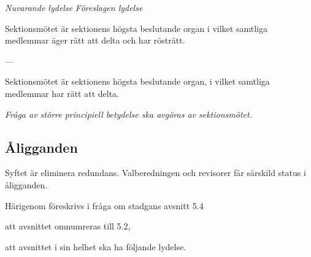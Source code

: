 \documentclass{article}
\newenvironment{lydelse}
    {\begin{paracol}{2}%
        \emph{Nuvarande lydelse}%
        \switchcolumn%
        \emph{Föreslagen lydelse}%
    \end{paracol}%
    \begin{enumerate}[label=\thesubsection.\arabic*]%
    \begin{paracol}{2}%
    }{\end{paracol}\end{enumerate}}
\begin{document}
\begin{lydelse}
  \setcounter{subsection}{1}
    \item Sektionsmötet är sektionens högsta beslutande organ i vilket samtliga medlemmar äger rätt att delta och har rösträtt.

    \item[] ---
  \switchcolumn
  \setcounter{subsection}{1}
  \setcounter{enumi}{0}
    \item Sektionsmötet är sektionens högsta beslutande organ, i vilket samtliga medlemmar har rätt att delta.

    \item \emph{Fråga av större principiell betydelse ska avgöras av sektionsmötet.}

\end{lydelse}

\setcounter{subsection}{1}
\subsection{Åligganden}
Syftet är eliminera redundans.
Valberedningen och revisorer får särskild status i åligganden.

Härigenom föreskrivs i fråga om stadgans avsnitt 5.4
\begin{dels}
    \item att avsnittet omnumreras till 5.2,
    \item att avsnittet i sin helhet ska ha följande lydelse.
\end{dels}
\end{document}
